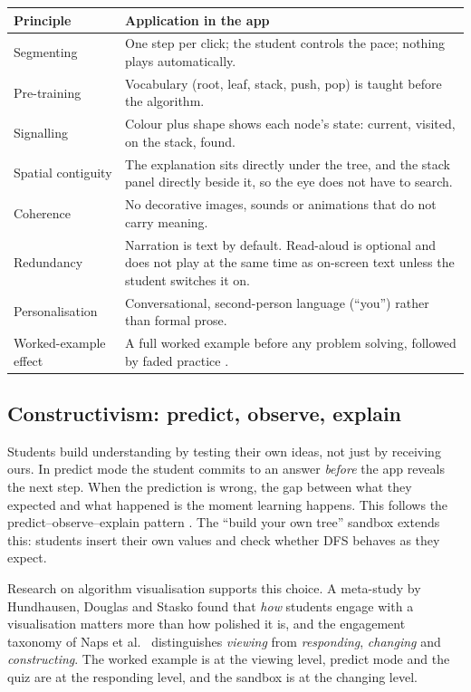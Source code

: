 \documentclass[11pt,a4paper]{article}
\begin{document}
\begin{longtable}{@{}p{3.4cm} p{11.4cm}@{}}
  \toprule
  \textbf{Principle} & \textbf{Application in the app} \\
  \midrule
  \endhead
  Segmenting & One step per click; the student controls the pace; nothing plays automatically. \\
  Pre-training & Vocabulary (root, leaf, stack, push, pop) is taught before the algorithm. \\
  Signalling & Colour plus shape shows each node's state: current, visited, on the stack, found. \\
  Spatial contiguity & The explanation sits directly under the tree, and the stack panel directly
                       beside it, so the eye does not have to search. \\
  Coherence & No decorative images, sounds or animations that do not carry meaning. \\
  Redundancy & Narration is text by default. Read-aloud is optional and does not play at the
               same time as on-screen text unless the student switches it on. \\
  Personalisation & Conversational, second-person language (``you'') rather than formal prose. \\
  Worked-example effect & A full worked example before any problem solving, followed by faded
                          practice \cite{atkinson2000}. \\
  \bottomrule
\end{longtable}

\subsection{Constructivism: predict, observe, explain}

Students build understanding by testing their own ideas, not just by receiving ours. In predict
mode the student commits to an answer \emph{before} the app reveals the next step. When the
prediction is wrong, the gap between what they expected and what happened is the moment learning
happens. This follows the predict--observe--explain pattern \cite{white1992}. The ``build your own
tree'' sandbox extends this: students insert their own values and check whether DFS behaves as they
expect.

Research on algorithm visualisation supports this choice. A meta-study by Hundhausen, Douglas and
Stasko \cite{hundhausen2002} found that \emph{how} students engage with a visualisation matters more
than how polished it is, and the engagement taxonomy of Naps et al.\ \cite{naps2002} distinguishes
\emph{viewing} from \emph{responding}, \emph{changing} and \emph{constructing}. The worked example is at
the viewing level, predict mode and the quiz are at the responding level, and the sandbox is at
the changing level.
\end{document}
